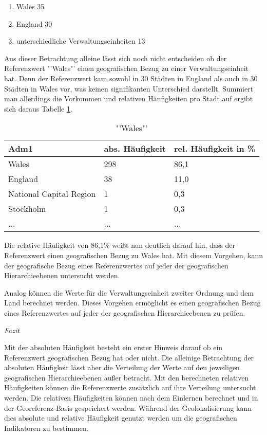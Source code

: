 			\begin{enumerate}
				\item Wales 35
				\item England 30
				\item unterschiedliche Verwaltungseinheiten 13
			\end{enumerate}

			Aus dieser Betrachtung alleine lässt sich noch nicht entscheiden ob der Referenzwert "'Wales"' einen geografischen Bezug zu einer Verwaltungseinheit hat.
			Denn der Referenzwert kam sowohl in 30 Städten in England als auch in 30 Städten in Wales vor, was keinen signifikanten Unterschied darstellt. 
			Summiert man allerdings die Vorkommen und relativen Häufigkeiten pro Stadt auf ergibt sich daraus Tabelle \ref{tab:WalesVerw1}.

			\begin{table}[h]
			\centering
			\caption{"'Wales"'}
			\label{tab:WalesVerw1}
			\begin{tabular}{|l|l|l|}
			\hline
			Adm1 & abs. Häufigkeit & rel. Häufigkeit in \% \\ \hline \hline
			Wales                   & 298 & 86,1 \\ \hline
			England                 & 38  & 11,0 \\ \hline
			National Capital Region & 1   & 0,3  \\ \hline
			Stockholm               & 1   & 0,3  \\ \hline
			... & ... & ... \\ \hline
			\end{tabular}
			\end{table}  

			Die relative Häufigkeit von 86,1\% weißt nun deutlich darauf hin, dass der Referenzwert einen geografischen Bezug zu Wales hat.
			Mit diesem Vorgehen, kann der geografische Bezug eines Referenzwertes auf jeder der geografischen Hierarchieebenen untersucht werden.

			Analog können die Werte für die Verwaltungseinheit zweiter Ordnung und dem Land berechnet werden.
			Dieses Vorgehen ermöglicht es einen geografischen Bezug eines Referenzwertes auf jeder der geografischen Hierarchieebenen zu prüfen.

		\textit{Fazit}

			Mit der absoluten Häufigkeit besteht ein erster Hinweis darauf ob ein Referenzwert geografischen Bezug hat oder nicht.
			Die alleinige Betrachtung der absoluten Häufigkeit lässt aber die Verteilung der Werte auf den jeweiligen geografischen Hierarchieebenen außer betracht.
			Mit den berechneten relativen Häufigkeiten können die Referenzwerte zusätzlich auf ihre Verteilung untersucht werden.
			Die relativen Häufigkeiten können nach dem Einlernen berechnet und in der Georeferenz-Basis gespeichert werden. 
			Während der Geolokalisierung kann dies absolute und relative Häufigkeit genutzt werden um die geografischen Indikatoren zu bestimmen. 

